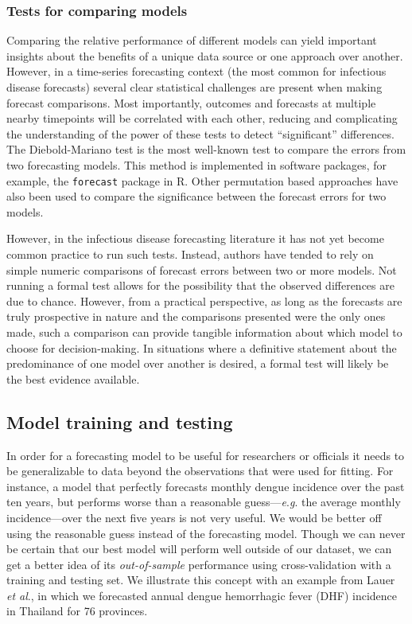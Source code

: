 \documentclass[a4paper]{article}
\newcommand{\etal}{\textit{et al}.}
\newcommand{\eg}{\textit{e}.\textit{g}. }
\begin{document}
\subsubsection{Tests for comparing models}

Comparing the relative performance of different models can yield important insights about the benefits of a unique data source or one approach over another.
However, in a time-series forecasting context (the most common for infectious disease forecasts) several clear statistical challenges are present when making forecast comparisons.
Most importantly, outcomes and forecasts at multiple nearby timepoints will be correlated with each other, reducing and complicating the understanding of the power of these tests to detect ``significant'' differences. 
The Diebold-Mariano test is the most well-known test to compare the errors from two forecasting models.\cite{diebold2002comparing} 
This method is implemented in software packages, for example, the {\tt forecast} package in R.\cite{hyndman2019package,hyndman2008book}
Other permutation based approaches have also been used to compare the significance between the forecast errors for two models.\cite{ray2018prediction}

However, in the infectious disease forecasting literature it has not yet become common practice to run such tests. 
Instead, authors have tended to rely on simple numeric comparisons of forecast errors between two or more models.
Not running a formal test allows for the possibility that the observed differences are due to chance.
However, from a practical perspective, as long as the forecasts are truly prospective in nature and the comparisons presented were the only ones made, such a comparison can provide tangible information about which model to choose for decision-making.
In situations where a definitive statement about the predominance of one model over another is desired, a formal test will likely be the best evidence available.

\subsection{Model training and testing}

In order for a forecasting model to be useful for researchers or officials it needs to be generalizable to data beyond the observations that were used for fitting.
For instance, a model that perfectly forecasts monthly dengue incidence over the past ten years, but performs worse than a reasonable guess---\eg the average monthly incidence---over the next five years is not very useful.
We would be better off using the reasonable guess instead of the forecasting model.
Though we can never be certain that our best model will perform well outside of our dataset, we can get a better idea of its \textit{out-of-sample} performance using cross-validation with a training and testing set.
We illustrate this concept with an example from Lauer \etal \cite{lauer2018prospective}, in which we forecasted annual dengue hemorrhagic fever (DHF) incidence in Thailand for 76 provinces.
\end{document}
